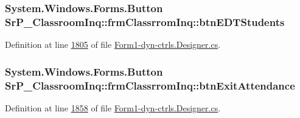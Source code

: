 \hypertarget{class_sr_p___classroom_inq_1_1frm_classrrom_inq_a527ceba70a2003fe9550f3fb3e307999}{
\subsubsection[{btn\-E\-D\-T\-Students}]{\setlength{\rightskip}{0pt plus 5cm}\-System.\-Windows.\-Forms.\-Button {\bf \-Sr\-P\-\_\-\-Classroom\-Inq\-::frm\-Classrrom\-Inq\-::btn\-E\-D\-T\-Students}}}
\label{class_sr_p___classroom_inq_1_1frm_classrrom_inq_a527ceba70a2003fe9550f3fb3e307999}


\-Definition at line \hyperlink{_form1-dyn-ctrls_8_designer_8cs_source_l01805}{1805} of file \hyperlink{_form1-dyn-ctrls_8_designer_8cs_source}{\-Form1-\/dyn-\/ctrls.\-Designer.\-cs}.

\hypertarget{class_sr_p___classroom_inq_1_1frm_classrrom_inq_a93fffe4de78481ddb21200cf66e89a17}{
\subsubsection[{btn\-Exit\-Attendance}]{\setlength{\rightskip}{0pt plus 5cm}\-System.\-Windows.\-Forms.\-Button {\bf \-Sr\-P\-\_\-\-Classroom\-Inq\-::frm\-Classrrom\-Inq\-::btn\-Exit\-Attendance}}}
\label{class_sr_p___classroom_inq_1_1frm_classrrom_inq_a93fffe4de78481ddb21200cf66e89a17}


\-Definition at line \hyperlink{_form1-dyn-ctrls_8_designer_8cs_source_l01858}{1858} of file \hyperlink{_form1-dyn-ctrls_8_designer_8cs_source}{\-Form1-\/dyn-\/ctrls.\-Designer.\-cs}.

